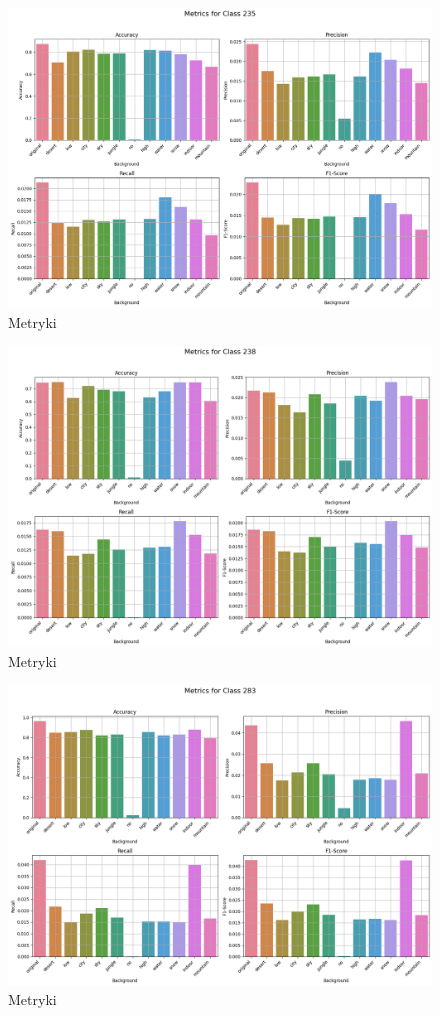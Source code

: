\begin{figure}
	\centering\includegraphics[width=.9\textwidth]{img/235}
	\caption{Metryki}
	\label{rys:235}
\end{figure}

\begin{figure}
	\centering\includegraphics[width=.9\textwidth]{img/238}
	\caption{Metryki}
	\label{rys:238}
\end{figure}

\begin{figure}
	\centering\includegraphics[width=.9\textwidth]{img/283}
	\caption{Metryki}
	\label{rys:283}
\end{figure}

